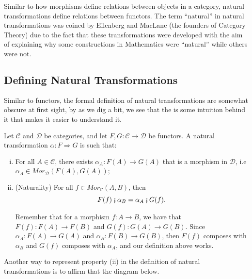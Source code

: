 Similar to how morphisms define relations between objects in a category, natural transformations
define relations between functors.
The term ``natural'' in natural transformations was coined by Eilenberg and MacLane (the founders
of Category Theory) due to the fact that these transformations were developed with the
aim of explaining why some constructions in Mathematics were ``natural'' while others
were not.


\subsection{Defining Natural Transformations}

Similar to functors, the formal definition of natural transformations
are somewhat obscure at first sight, by as we dig a bit, we see that the is
some intuition behind it that makes it easier to understand it.

\begin{definition}
	Let $\mathcal C$ and $\mathcal D$ be categories, and let $F,G:\mathcal C \to \mathcal D$ be functors.
	A natural transformation $\alpha: F \Rightarrow G$ is such that:
	\begin{enumerate}[(i)]
		\item For all $A \in \mathcal C$, there exists $\alpha_A :F(A) \to G(A)$ that is
		      a morphism in $\mathcal D$, i.e $\alpha_A \in Mor_\mathcal D (F(A), G(A))$;
		\item (Naturality) For all $f \in Mor_\mathcal C (A,B)$, then
		      \begin{displaymath}
			      F(f)\fatsemi \alpha_B = \alpha_A \fatsemi G(f).
		      \end{displaymath}

		      Remember that for a morphism $f:A \to B$, we have that $F(f):F(A)\to F(B)$ and $G(f):G(A) \to G(B)$.
		      Since $\alpha_A: F(A) \to G(A)$ and $\alpha_B : F(B) \to G(B)$, then $F(f)$ composes
		      with $\alpha_B$ and $G(f)$ composes with $\alpha_A$, and our definition above works.
	\end{enumerate}
	\label{def:NaturalTransformation}
\end{definition}

Another way to represent property (ii) in the definition of natural transformations
is to affirm that the diagram below.

